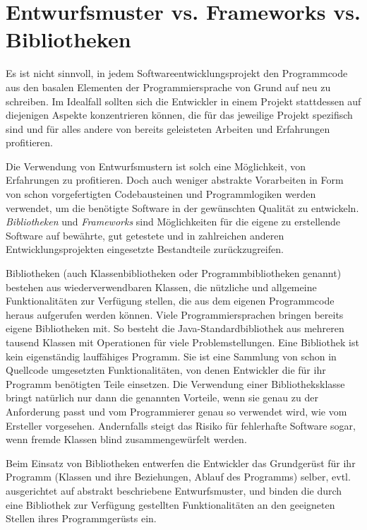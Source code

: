 \section{Entwurfsmuster vs. Frameworks vs. Bibliotheken}
\label{sec:Kap-10.4}

Es ist nicht sinnvoll, in jedem Softwareentwicklungsprojekt den Programmcode aus den basalen Elementen der Programmiersprache von Grund auf neu zu schreiben. Im Idealfall sollten sich die Entwickler in einem Projekt stattdessen auf diejenigen Aspekte konzentrieren können, die für das jeweilige Projekt spezifisch sind und für alles andere von bereits geleisteten Arbeiten und Erfahrungen profitieren.

Die Verwendung von Entwurfsmustern ist solch eine Möglichkeit, von Erfahrungen zu profitieren. Doch auch weniger abstrakte Vorarbeiten in Form von schon vor\-ge\-fertigten Codebausteinen und Programmlogiken werden verwendet, um die benötigte Software in der gewünschten Qualität zu entwickeln. \textit{Bibliotheken} und \textit{Frameworks} sind Möglichkeiten für die eigene zu erstellende Software auf bewährte, gut getestete und in zahlreichen anderen Entwicklungsprojekten eingesetzte Bestandteile zurückzugreifen.

Bibliotheken  (auch Klassenbibliotheken oder Programmbibliotheken genannt) bestehen aus wiederverwendbaren Klassen, die nützliche und allgemeine Funktionalitäten zur Verfügung stellen, die aus dem eigenen Programmcode heraus aufgerufen werden können. Viele Programmiersprachen bringen bereits eigene Bibliotheken mit. So besteht die Java-Standardbibliothek aus mehreren tausend Klassen mit Operationen für viele Problemstellungen. Eine Bibliothek ist kein eigenständig lauf{}fähiges Programm. Sie ist eine Sammlung von schon in Quellcode umgesetzten Funktionalitäten, von denen Entwickler die für ihr Programm benötigten Teile einsetzen. Die Verwendung einer Bibliotheksklasse bringt natürlich nur dann die genannten Vorteile, wenn sie genau zu der Anforderung passt und vom Programmierer genau so verwendet wird, wie vom Ersteller vorgesehen. Andernfalls steigt das Risiko für fehlerhafte Software sogar, wenn fremde Klassen blind zusammengewürfelt werden.
 
Beim Einsatz von Bibliotheken entwerfen die Entwickler das Grundgerüst für ihr Programm (Klassen und ihre Beziehungen, Ablauf des Programms) selber, evtl. ausgerichtet auf abstrakt beschriebene Entwurfsmuster, und binden die durch eine Bibliothek zur Verfügung gestellten Funktionalitäten an den geeigneten Stellen ihres Programmgerüsts ein.

